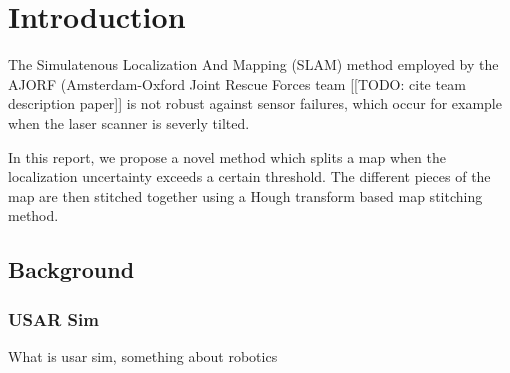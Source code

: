 \chapter{Introduction}
\label{chapter:introduction}
The Simulatenous Localization And Mapping (SLAM) method employed by the AJORF (Amsterdam-Oxford Joint Rescue Forces team [[TODO: cite team description paper]] is not robust against sensor failures, which occur for example when the laser scanner is severly tilted. 

In this report, we propose a novel method which splits a map when the localization uncertainty exceeds a certain threshold. The different pieces of the map are then stitched together using a Hough transform based map stitching method.

\section{Background}
\subsection{USAR Sim}
What is usar sim, something about robotics
